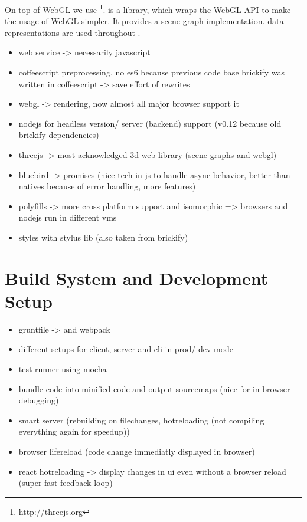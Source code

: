 \documentclass[../ClassicThesis.tex]{subfiles}
\begin{document}
On top of WebGL we use
{\threejs}\footnote{\url{http://threejs.org}}. {\threejs} is
a {\javascript} library, which wraps the WebGL API to make
the usage of WebGL simpler. It provides a scene graph
implementation. {\threejs} data representations are used
throughout {\convertify}.


\begin{itemize}
\item web service -> necessarily javascript
\item coffeescript preprocessing, no es6 because previous code base
  brickify was written in coffeescript -> save effort of rewrites
\item webgl -> rendering, now almost all major browser support it
\item nodejs for headless version/ server (backend) support (v0.12
  because old brickify dependencies)
\item threejs -> most acknowledged 3d web library (scene graphs and
  webgl)
\item bluebird -> promises (nice tech in js to handle async behavior,
  better than natives because of error handling, more features)
\item polyfills -> more cross platform support and isomorphic =>
  browsers and nodejs run in different vms
\item styles with stylus lib (also taken from brickify)
\end{itemize}

\section{Build System and Development Setup}

\begin{itemize}
\item gruntfile -> and webpack
\item different setups for client, server and cli in prod/ dev mode
\item test runner using mocha
\item bundle code into minified code and output sourcemaps (nice for
  in browser debugging)
\item smart server (rebuilding on filechanges, hotreloading (not
  compiling everything again for speedup))
\item browser lifereload (code change immediatly displayed in browser)
\item react hotreloading -> display changes in ui even without a
  browser reload (super fast feedback loop)
\end{itemize}
\end{document}
